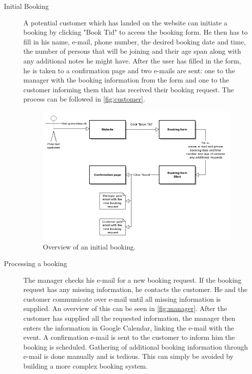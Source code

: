 \begin{description}
\item[Initial Booking]
A potential customer which has landed on the website can initiate a booking
by clicking "Book Tid" to access the booking form. He then has to fill in his name, e-mail, phone number, 
the desired booking date and time, the number of persons that will be joining and their
age span along with any additional notes he might have. 
After the user has filled in the form, he is taken to a confirmation
page and two e-mails are sent: one to the manager with the booking information from the form and
one to the customer informing them that \gomonkey{} has received their booking request. The process
can be followed in \autoref{fig:customer}.

\begin{figure}[htbp]
    \centering
        \includegraphics[width=\textwidth]{figures/customer.png}
            \caption{Overview of an initial booking.}
        \label{fig:customer}
\end{figure}

\item[Processing a booking] The manager checks his e-mail for a new booking
    request. If the booking request has any missing information, he contacts the
    customer.  He and the customer communicate over e-mail until all missing
    information is supplied.  An overview of this can be seen in
    \autoref{fig:manager}.  After the customer has supplied all the requested
    information, the manager then enters the information in Google Calendar,
    linking the e-mail with the event. A confirmation e-mail is sent to the
    customer to inform him the booking is scheduled.  Gathering of additional
    booking information through e-mail is done manually and is tedious. This can
    simply be avoided by building a more complex booking system. 


\end{description}
